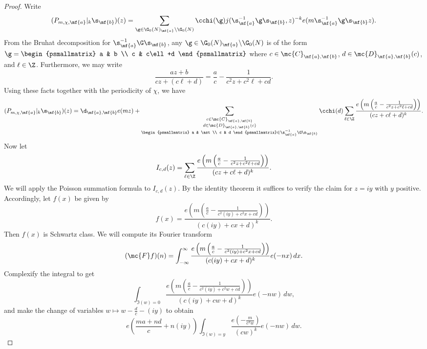 \documentclass[12pt]{article}
\begin{document}
      \begin{proof}
        Write
        \[
          (P_{m,\chi,\mf{a}}|_{k}\s_{\mf{b}})(z) = \sum_{\g \in \G_{0}(N)_{\mf{a}}\backslash\G_{0}(N)}\cchi(\g)j(\s_{\mf{a}}^{-1}\g\s_{\mf{b}},z)^{-k}e(m\s_{\mf{a}}^{-1}\g\s_{\mf{b}}z).
        \]
        From the Bruhat decomposition for \(\s_{\mf{a}}^{-1}\G\s_{\mf{b}}\), any \(\g \in \G_{0}(N)_{\mf{a}}\backslash\G_{0}(N)\) is of the form \(\g = \begin{psmallmatrix} a & b \\ c & c\ell+d \end{psmallmatrix}\) where \(c \in \mc{C}_{\mf{a},\mf{b}}\), \(d \in \mc{D}_{\mf{a},\mf{b}}(c)\), and \(\ell \in \Z\). Furthermore, we may write
        \[
          \frac{az+b}{cz+(c\ell+d)} = \frac{a}{c}-\frac{1}{c^{2}z+c^{2}\ell+cd}.
        \]
        Using these facts together with the periodicity of \(\chi\), we have
        \[
          (P_{m,\chi,\mf{a}}|_{k}\s_{\mf{b}})(z) = \d_{\mf{a},\mf{b}}e(mz)+\sum_{\substack{\substack{c \in \mc{C}_{\mf{a},\mf{b}} \\ d \in \mc{D}_{\mf{a},\mf{b}}(c)} \\ \begin{psmallmatrix} a & \ast \\ c & d \end{psmallmatrix} \in \s_{\mf{a}}^{-1}\G\s_{\mf{b}}}}\cchi(d)\sum_{\ell \in \Z}\frac{e\left(m\left(\frac{a}{c}-\frac{1}{c^{2}z+c^{2}\ell+cd}\right)\right)}{(cz+c\ell+d)^{k}}.
        \]
        Now let
        \[
          I_{c,d}(z) = \sum_{\ell \in \Z}\frac{e\left(m\left(\frac{a}{c}-\frac{1}{c^{2}z+c^{2}\ell+cd}\right)\right)}{(cz+c\ell+d)^{k}}.
        \]
        We will apply the Poisson summation formula to \(I_{c,d}(z)\). By the identity theorem it suffices to verify the claim for \(z = iy\) with \(y\) positive. Accordingly, let \(f(x)\) be given by
        \[
          f(x) = \frac{e\left(m\left(\frac{a}{c}-\frac{1}{c^{2}(iy)+c^{2}x+cd}\right)\right)}{(c(iy)+cx+d)^{k}}.
        \]
        Then \(f(x)\) is Schwartz class. We will compute its Fourier transform
        \[
          (\mc{F}f)(n) = \int_{-\infty}^{\infty}\frac{e\left(m\left(\frac{a}{c}-\frac{1}{c^{2}(iy)+c^{2}x+cd}\right)\right)}{(c(iy)+cx+d)^{k}}e(-nx)\,dx.
        \]
        Complexify the integral to get
        \[
          \int_{\Im(w) = 0}\frac{e\left(m\left(\frac{a}{c}-\frac{1}{c^{2}(iy)+c^{2}w+cd}\right)\right)}{(c(iy)+cw+d)^{k}}e(-nw)\,dw,
        \]
        and make the change of variables \(w \mapsto w-\frac{d}{c}-(iy)\) to obtain
        \[
          e\left(\frac{ma+nd}{c}+n(iy)\right)\int_{\Im(w) = y}\frac{e\left(-\frac{m}{c^{2}w}\right)}{(cw)^{k}}e(-nw)\,dw.
\]
\end{proof}
\end{document}
